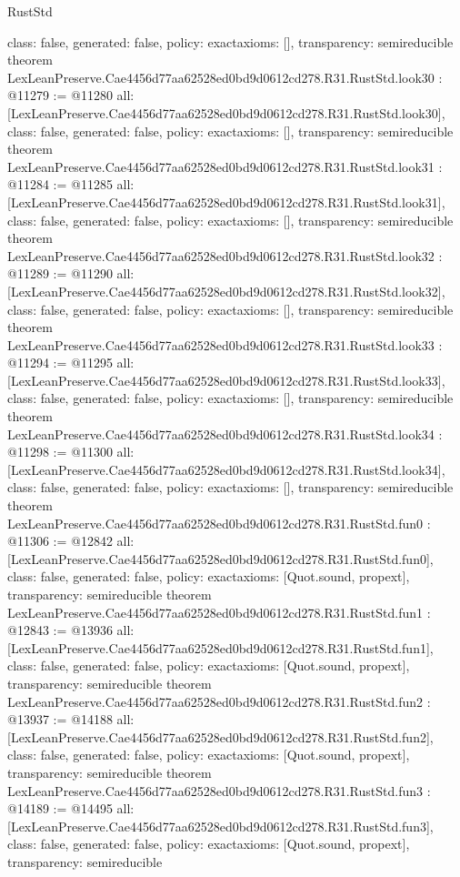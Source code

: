 \begin{lexlean}{RustStd}
\begin{coremodule}
{  class: false,
  generated: false,
  policy: exact{axioms: []},
  transparency: semireducible
}
theorem LexLeanPreserve.Cae4456d77aa62528ed0bd9d0612cd278.R31.RustStd.look30 : @11279 := @11280 {
  all: [LexLeanPreserve.Cae4456d77aa62528ed0bd9d0612cd278.R31.RustStd.look30],
  class: false,
  generated: false,
  policy: exact{axioms: []},
  transparency: semireducible
}
theorem LexLeanPreserve.Cae4456d77aa62528ed0bd9d0612cd278.R31.RustStd.look31 : @11284 := @11285 {
  all: [LexLeanPreserve.Cae4456d77aa62528ed0bd9d0612cd278.R31.RustStd.look31],
  class: false,
  generated: false,
  policy: exact{axioms: []},
  transparency: semireducible
}
theorem LexLeanPreserve.Cae4456d77aa62528ed0bd9d0612cd278.R31.RustStd.look32 : @11289 := @11290 {
  all: [LexLeanPreserve.Cae4456d77aa62528ed0bd9d0612cd278.R31.RustStd.look32],
  class: false,
  generated: false,
  policy: exact{axioms: []},
  transparency: semireducible
}
theorem LexLeanPreserve.Cae4456d77aa62528ed0bd9d0612cd278.R31.RustStd.look33 : @11294 := @11295 {
  all: [LexLeanPreserve.Cae4456d77aa62528ed0bd9d0612cd278.R31.RustStd.look33],
  class: false,
  generated: false,
  policy: exact{axioms: []},
  transparency: semireducible
}
theorem LexLeanPreserve.Cae4456d77aa62528ed0bd9d0612cd278.R31.RustStd.look34 : @11298 := @11300 {
  all: [LexLeanPreserve.Cae4456d77aa62528ed0bd9d0612cd278.R31.RustStd.look34],
  class: false,
  generated: false,
  policy: exact{axioms: []},
  transparency: semireducible
}
theorem LexLeanPreserve.Cae4456d77aa62528ed0bd9d0612cd278.R31.RustStd.fun0 : @11306 := @12842 {
  all: [LexLeanPreserve.Cae4456d77aa62528ed0bd9d0612cd278.R31.RustStd.fun0],
  class: false,
  generated: false,
  policy: exact{axioms: [Quot.sound, propext]},
  transparency: semireducible
}
theorem LexLeanPreserve.Cae4456d77aa62528ed0bd9d0612cd278.R31.RustStd.fun1 : @12843 := @13936 {
  all: [LexLeanPreserve.Cae4456d77aa62528ed0bd9d0612cd278.R31.RustStd.fun1],
  class: false,
  generated: false,
  policy: exact{axioms: [Quot.sound, propext]},
  transparency: semireducible
}
theorem LexLeanPreserve.Cae4456d77aa62528ed0bd9d0612cd278.R31.RustStd.fun2 : @13937 := @14188 {
  all: [LexLeanPreserve.Cae4456d77aa62528ed0bd9d0612cd278.R31.RustStd.fun2],
  class: false,
  generated: false,
  policy: exact{axioms: [Quot.sound, propext]},
  transparency: semireducible
}
theorem LexLeanPreserve.Cae4456d77aa62528ed0bd9d0612cd278.R31.RustStd.fun3 : @14189 := @14495 {
  all: [LexLeanPreserve.Cae4456d77aa62528ed0bd9d0612cd278.R31.RustStd.fun3],
  class: false,
  generated: false,
  policy: exact{axioms: [Quot.sound, propext]},
  transparency: semireducible
}
\end{coremodule}
\end{lexlean}
